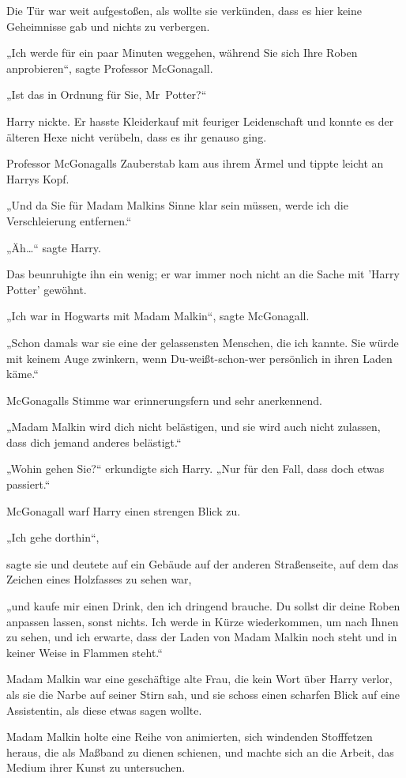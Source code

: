 {Die Tür war weit aufgestoßen, als wollte sie verkünden, dass es hier keine Geheimnisse gab und nichts zu verbergen.

„Ich werde für ein paar Minuten weggehen, während Sie sich Ihre Roben anprobieren“, sagte Professor McGonagall.

„Ist das in Ordnung für Sie, Mr~Potter?“

Harry nickte. Er hasste Kleiderkauf mit feuriger Leidenschaft und konnte es der älteren Hexe nicht verübeln, dass es ihr genauso ging.

Professor McGonagalls Zauberstab kam aus ihrem Ärmel und tippte leicht an Harrys Kopf.

„Und da Sie für Madam Malkins Sinne klar sein müssen, werde ich die Verschleierung entfernen.“

„Äh…“ sagte Harry.

Das beunruhigte ihn ein wenig; er war immer noch nicht an die Sache mit 'Harry Potter' gewöhnt.

„Ich war in Hogwarts mit Madam Malkin“, sagte McGonagall.

„Schon damals war sie eine der gelassensten Menschen, die ich kannte. Sie würde mit keinem Auge zwinkern, wenn Du-weißt-schon-wer persönlich in ihren Laden käme.“

McGonagalls Stimme war erinnerungsfern und sehr anerkennend.

„Madam Malkin wird dich nicht belästigen, und sie wird auch nicht zulassen, dass dich jemand anderes belästigt.“

„Wohin gehen Sie?“ erkundigte sich Harry. „Nur für den Fall, dass doch etwas passiert.“

McGonagall warf Harry einen strengen Blick zu.

„Ich gehe dorthin“,

sagte sie und deutete auf ein Gebäude auf der anderen Straßenseite, auf dem das Zeichen eines Holzfasses zu sehen war,

„und kaufe mir einen Drink, den ich dringend brauche. Du sollst dir deine Roben anpassen lassen, sonst nichts. Ich werde in Kürze wiederkommen, um nach Ihnen zu sehen, und ich erwarte, dass der Laden von Madam Malkin noch steht und in keiner Weise in Flammen steht.“

Madam Malkin war eine geschäftige alte Frau, die kein Wort über Harry verlor, als sie die Narbe auf seiner Stirn sah, und sie schoss einen scharfen Blick auf eine Assistentin, als diese etwas sagen wollte.

Madam Malkin holte eine Reihe von animierten, sich windenden Stofffetzen heraus, die als Maßband zu dienen schienen, und machte sich an die Arbeit, das Medium ihrer Kunst zu untersuchen.

}
